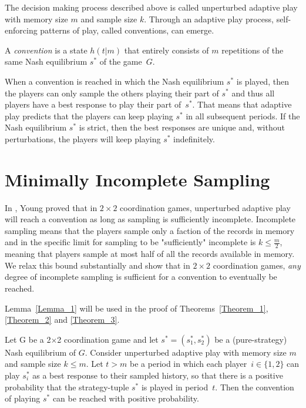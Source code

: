 \bigskip

The decision making process described above is called unperturbed adaptive play with memory size $m$ and sample size $k$. Through an adaptive play process, self-enforcing patterns of play, called conventions, can emerge.


\begin{definition}
A {\emph{convention}} is a state $h(t|m)$ that entirely consists of $m$ repetitions of the same Nash equilibrium $s^*$ of the game~$G$.
\end{definition}

When a convention is reached in which the Nash equilibrium $s^*$ is played, then the players can only sample the others playing their part of $s^*$ and thus all players have a best response to play their part of~$s^*$. That means that adaptive play predicts that the players can keep playing $s^*$ in all subsequent periods. If the Nash equilibrium $s^*$ is strict, then the best responses are unique and, without perturbations, the players will keep playing $s^*$ indefinitely. 

\section{Minimally Incomplete Sampling} 



In \cite{Young1998}, Young proved that in $2\times 2$ coordination games, unperturbed adaptive play will reach a convention as long as sampling is sufficiently incomplete. Incomplete sampling means that the players sample only a faction of the records in memory and in \cite{Young1998} the specific limit for sampling to be "sufficiently" incomplete is $k \leq \frac{m}{2}$, meaning that players sample at most half of all the records available in memory. 
We relax this bound substantially and show that in $2\times 2$ coordination games, {\emph {any} }degree of incomplete sampling is sufficient for a convention to eventually be reached.





Lemma~\ref{Lemma_1} will be used in the proof of Theorems~\ref{Theorem_1}, \ref{Theorem_2} and \ref{Theorem_3}.

\vskip12pt




\begin{lemma}\label{Lemma_1} Let G be a 2$\times$2 coordination game and let $s^* = (s^*_1, s^*_2)$ be a (pure-strategy) Nash equilibrium of $G$. Consider unperturbed adaptive play with memory size $m$ and sample size $k\leq m$. Let $t > m$ be a period in which each player~$i\in\{1,2\}$ can play $s^*_i$ as a best response to their sampled history, so that there is a positive probability that the strategy-tuple $s^*$ is played in period~$t$. Then the convention of playing $s^*$ can be reached with positive probability.
\end{lemma}



